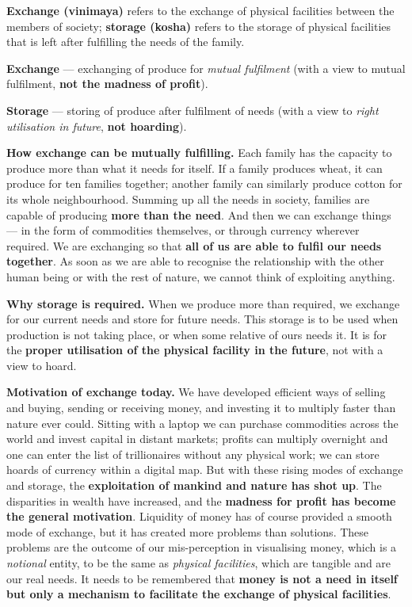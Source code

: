 \ans \textbf{Exchange (vinimaya)} refers to the exchange of physical
facilities between the members of society; \textbf{storage (kosha)} refers to
the storage of physical facilities that is left after fulfilling the needs of
the family.

\begin{abul}
\item \textbf{Exchange} --- exchanging of produce for \emph{mutual
      fulfilment} (with a view to mutual fulfilment, \textbf{not the madness
      of profit}).
\item \textbf{Storage} --- storing of produce after fulfilment of needs (with
      a view to \emph{right utilisation in future}, \textbf{not hoarding}).
\end{abul}

\textbf{How exchange can be mutually fulfilling.} Each family has the capacity
to produce more than what it needs for itself. If a family produces wheat, it
can produce for ten families together; another family can similarly produce
cotton for its whole neighbourhood. Summing up all the needs in society,
families are capable of producing \textbf{more than the need}. And then we can
exchange things --- in the form of commodities themselves, or through currency
wherever required. We are exchanging so that \textbf{all of us are able to
fulfil our needs together}. As soon as we are able to recognise the
relationship with the other human being or with the rest of nature, we cannot
think of exploiting anything.

\textbf{Why storage is required.} When we produce more than required, we
exchange for our current needs and store for future needs. This storage is to
be used when production is not taking place, or when some relative of ours
needs it. It is for the \textbf{proper utilisation of the physical facility in
the future}, not with a view to hoard.

\textbf{Motivation of exchange today.} We have developed efficient ways of
selling and buying, sending or receiving money, and investing it to multiply
faster than nature ever could. Sitting with a laptop we can purchase
commodities across the world and invest capital in distant markets; profits
can multiply overnight and one can enter the list of trillionaires without any
physical work; we can store hoards of currency within a digital map. But with
these rising modes of exchange and storage, the \textbf{exploitation of mankind
and nature has shot up}. The disparities in wealth have increased, and the
\textbf{madness for profit has become the general motivation}. Liquidity of
money has of course provided a smooth mode of exchange, but it has created
more problems than solutions. These problems are the outcome of our
mis-perception in visualising money, which is a \emph{notional} entity, to be
the same as \emph{physical facilities}, which are tangible and are our real
needs. It needs to be remembered that \textbf{money is not a need in itself but
only a mechanism to facilitate the exchange of physical facilities}.

